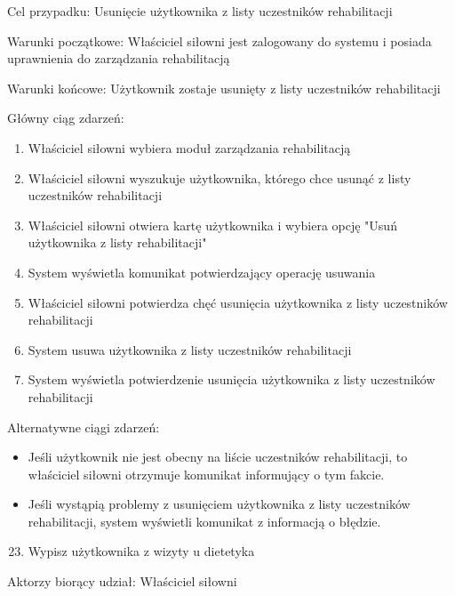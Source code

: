 \documentclass[
]{article}
\providecommand{\tightlist}{%
  \setlength{\itemsep}{0pt}\setlength{\parskip}{0pt}}
\begin{document}
{Cel przypadku: Usunięcie użytkownika z listy uczestników rehabilitacji}

{Warunki początkowe: Właściciel siłowni jest zalogowany do systemu i
posiada uprawnienia do zarządzania rehabilitacją}

{Warunki końcowe: Użytkownik zostaje usunięty z listy uczestników
rehabilitacji}

{Główny ciąg zdarzeń:}

\begin{enumerate}
\tightlist
\item
  {Właściciel siłowni wybiera moduł zarządzania rehabilitacją}
\item
  {Właściciel siłowni wyszukuje użytkownika, którego chce usunąć z listy
  uczestników rehabilitacji}
\item
  {Właściciel siłowni otwiera kartę użytkownika i wybiera opcję "Usuń
  użytkownika z listy rehabilitacji"}
\item
  {System wyświetla komunikat potwierdzający operację usuwania}
\item
  {Właściciel siłowni potwierdza chęć usunięcia użytkownika z listy
  uczestników rehabilitacji}
\item
  {System usuwa użytkownika z listy uczestników rehabilitacji}
\item
  {System wyświetla potwierdzenie usunięcia użytkownika z listy
  uczestników rehabilitacji}
\end{enumerate}

{Alternatywne ciągi zdarzeń:}

\begin{itemize}
\tightlist
\item
  {Jeśli użytkownik nie jest obecny na liście uczestników rehabilitacji,
  to właściciel siłowni otrzymuje komunikat informujący o tym fakcie.}
\item
  {Jeśli wystąpią problemy z usunięciem użytkownika z listy uczestników
  rehabilitacji, system wyświetli komunikat z informacją o błędzie.}
\end{itemize}

{}

{}

\begin{enumerate}
\setcounter{enumi}{22}
\tightlist
\item
  {Wypisz użytkownika z wizyty u dietetyka}
\end{enumerate}

{Aktorzy biorący udział: Właściciel siłowni}
\end{document}
